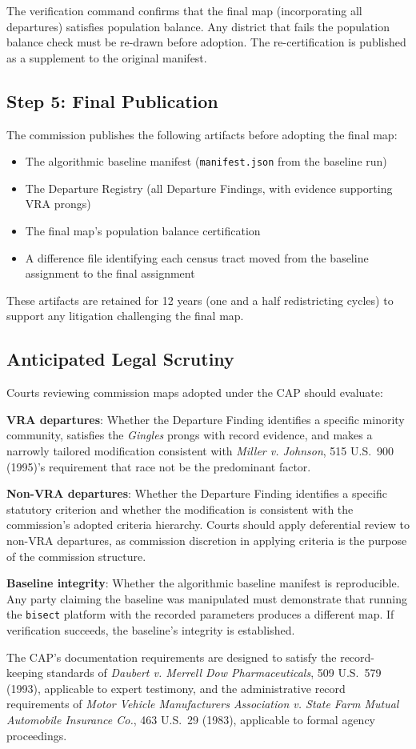 The verification command confirms that the final map (incorporating all departures) satisfies population balance. Any district that fails the population balance check must be re-drawn before adoption. The re-certification is published as a supplement to the original manifest.

\subsection{Step 5: Final Publication}

The commission publishes the following artifacts before adopting the final map:

\begin{itemize}
  \item The algorithmic baseline manifest (\texttt{manifest.json} from the baseline run)
  \item The Departure Registry (all Departure Findings, with evidence supporting VRA prongs)
  \item The final map's population balance certification
  \item A difference file identifying each census tract moved from the baseline assignment to the final assignment
\end{itemize}

These artifacts are retained for 12 years (one and a half redistricting cycles) to support any litigation challenging the final map.

\subsection{Anticipated Legal Scrutiny}

Courts reviewing commission maps adopted under the CAP should evaluate:

\textbf{VRA departures}: Whether the Departure Finding identifies a specific minority community, satisfies the \textit{Gingles} prongs with record evidence, and makes a narrowly tailored modification consistent with \textit{Miller v. Johnson}, 515 U.S.\ 900 (1995)'s requirement that race not be the predominant factor.

\textbf{Non-VRA departures}: Whether the Departure Finding identifies a specific statutory criterion and whether the modification is consistent with the commission's adopted criteria hierarchy. Courts should apply deferential review to non-VRA departures, as commission discretion in applying criteria is the purpose of the commission structure.

\textbf{Baseline integrity}: Whether the algorithmic baseline manifest is reproducible. Any party claiming the baseline was manipulated must demonstrate that running the \texttt{bisect} platform with the recorded parameters produces a different map. If verification succeeds, the baseline's integrity is established.

The CAP's documentation requirements are designed to satisfy the record-keeping standards of \textit{Daubert v. Merrell Dow Pharmaceuticals}, 509 U.S.\ 579 (1993), applicable to expert testimony, and the administrative record requirements of \textit{Motor Vehicle Manufacturers Association v. State Farm Mutual Automobile Insurance Co.}, 463 U.S.\ 29 (1983), applicable to formal agency proceedings.
